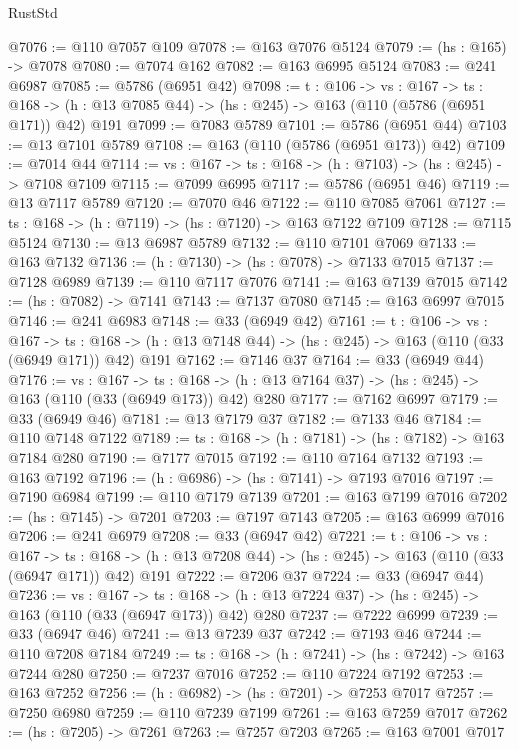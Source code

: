 \begin{lexlean}{RustStd}
\begin{coremodule}
@7076 := @110 @7057 @109
@7078 := @163 @7076 @5124
@7079 := (hs : @165) -> @7078
@7080 := @7074 @162
@7082 := @163 @6995 @5124
@7083 := @241 @6987
@7085 := @5786 (@6951 @42)
@7098 := {t : @106} ->
  {vs : @167} ->
  {ts : @168} -> (h : @13 @7085 @44) -> (hs : @245) -> @163 (@110 (@5786 (@6951 @171)) @42) @191
@7099 := @7083 @5789
@7101 := @5786 (@6951 @44)
@7103 := @13 @7101 @5789
@7108 := @163 (@110 (@5786 (@6951 @173)) @42)
@7109 := @7014 @44
@7114 := {vs : @167} -> {ts : @168} -> (h : @7103) -> (hs : @245) -> @7108 @7109
@7115 := @7099 @6995
@7117 := @5786 (@6951 @46)
@7119 := @13 @7117 @5789
@7120 := @7070 @46
@7122 := @110 @7085 @7061
@7127 := {ts : @168} -> (h : @7119) -> (hs : @7120) -> @163 @7122 @7109
@7128 := @7115 @5124
@7130 := @13 @6987 @5789
@7132 := @110 @7101 @7069
@7133 := @163 @7132
@7136 := (h : @7130) -> (hs : @7078) -> @7133 @7015
@7137 := @7128 @6989
@7139 := @110 @7117 @7076
@7141 := @163 @7139 @7015
@7142 := (hs : @7082) -> @7141
@7143 := @7137 @7080
@7145 := @163 @6997 @7015
@7146 := @241 @6983
@7148 := @33 (@6949 @42)
@7161 := {t : @106} ->
  {vs : @167} ->
  {ts : @168} -> (h : @13 @7148 @44) -> (hs : @245) -> @163 (@110 (@33 (@6949 @171)) @42) @191
@7162 := @7146 @37
@7164 := @33 (@6949 @44)
@7176 := {vs : @167} ->
  {ts : @168} -> (h : @13 @7164 @37) -> (hs : @245) -> @163 (@110 (@33 (@6949 @173)) @42) @280
@7177 := @7162 @6997
@7179 := @33 (@6949 @46)
@7181 := @13 @7179 @37
@7182 := @7133 @46
@7184 := @110 @7148 @7122
@7189 := {ts : @168} -> (h : @7181) -> (hs : @7182) -> @163 @7184 @280
@7190 := @7177 @7015
@7192 := @110 @7164 @7132
@7193 := @163 @7192
@7196 := (h : @6986) -> (hs : @7141) -> @7193 @7016
@7197 := @7190 @6984
@7199 := @110 @7179 @7139
@7201 := @163 @7199 @7016
@7202 := (hs : @7145) -> @7201
@7203 := @7197 @7143
@7205 := @163 @6999 @7016
@7206 := @241 @6979
@7208 := @33 (@6947 @42)
@7221 := {t : @106} ->
  {vs : @167} ->
  {ts : @168} -> (h : @13 @7208 @44) -> (hs : @245) -> @163 (@110 (@33 (@6947 @171)) @42) @191
@7222 := @7206 @37
@7224 := @33 (@6947 @44)
@7236 := {vs : @167} ->
  {ts : @168} -> (h : @13 @7224 @37) -> (hs : @245) -> @163 (@110 (@33 (@6947 @173)) @42) @280
@7237 := @7222 @6999
@7239 := @33 (@6947 @46)
@7241 := @13 @7239 @37
@7242 := @7193 @46
@7244 := @110 @7208 @7184
@7249 := {ts : @168} -> (h : @7241) -> (hs : @7242) -> @163 @7244 @280
@7250 := @7237 @7016
@7252 := @110 @7224 @7192
@7253 := @163 @7252
@7256 := (h : @6982) -> (hs : @7201) -> @7253 @7017
@7257 := @7250 @6980
@7259 := @110 @7239 @7199
@7261 := @163 @7259 @7017
@7262 := (hs : @7205) -> @7261
@7263 := @7257 @7203
@7265 := @163 @7001 @7017

\end{coremodule}
\end{lexlean}
